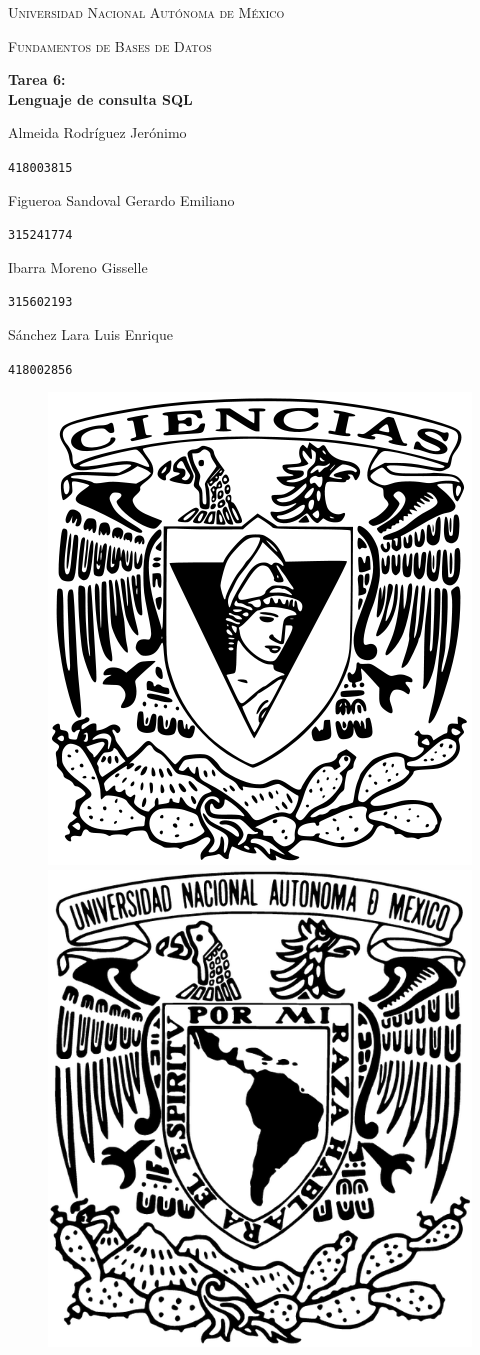 \documentclass[a4paper, 12pt]{report}
\begin{document}
\begin{titlepage}
    \centering
    {\scshape\Huge Universidad Nacional Autónoma de México \par}
    \vspace{1.25cm}
    {\scshape\huge Fundamentos de Bases de Datos\par}
    \vspace{1.25cm}
    {\huge\bfseries Tarea 6:\\ Lenguaje de consulta SQL\par}
    \vspace{1.25cm}
    {\Large\textsc Almeida Rodríguez Jerónimo\par}
    \vspace{.1cm}
    {\large\texttt{418003815}\par}
    \vspace{0.25cm}
    {\Large\textsc Figueroa Sandoval Gerardo Emiliano\par}
    \vspace{.1cm}
    {\large\texttt{315241774}\par}
    \vspace{0.25cm}
    {\Large\textsc Ibarra Moreno Gisselle \par}
    \vspace{.1cm}
    {\large\texttt{315602193}\par}
    \vspace{0.25cm}
    {\Large\textsc Sánchez Lara Luis Enrique \par}
    \vspace{.1cm}
    {\large\texttt{418002856}\par}
    \vspace{1.5cm}
    \vfill
    \begin{figure}[hb!]
        \includegraphics[width=.3\textwidth]
            {../../logos/escudo_f-ciencias.png}\hfill
        \includegraphics[width=.3\textwidth]
            {../../logos/Escudo_UNAM.png}\hfill
    \end{figure}
\end{titlepage}
\end{document}
